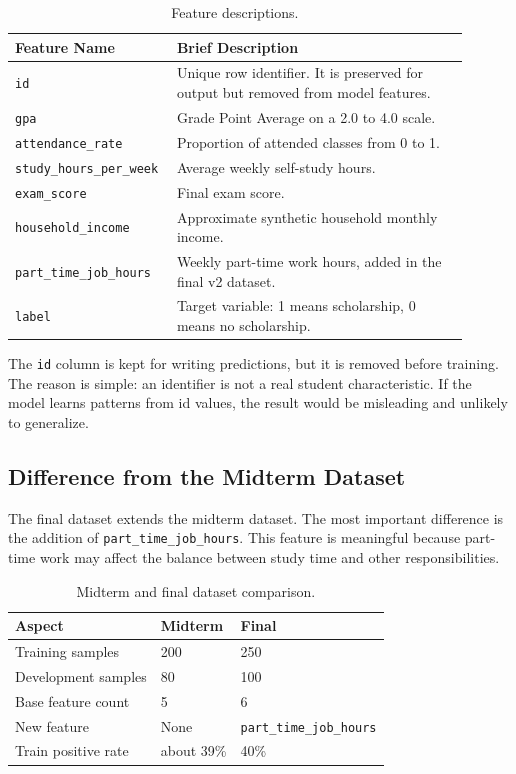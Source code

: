 ﻿\documentclass[12pt,a4paper]{article}
\begin{document}
\begin{table}[H]
\centering
\caption{Feature descriptions.}
\begin{tabular}{p{0.28\linewidth}p{0.62\linewidth}}
\toprule
\textbf{Feature Name} & \textbf{Brief Description} \\
\midrule
\texttt{id} & Unique row identifier. It is preserved for output but removed from model features. \\
\texttt{gpa} & Grade Point Average on a 2.0 to 4.0 scale. \\
\texttt{attendance\_rate} & Proportion of attended classes from 0 to 1. \\
\texttt{study\_hours\_per\_week} & Average weekly self-study hours. \\
\texttt{exam\_score} & Final exam score. \\
\texttt{household\_income} & Approximate synthetic household monthly income. \\
\texttt{part\_time\_job\_hours} & Weekly part-time work hours, added in the final v2 dataset. \\
\texttt{label} & Target variable: 1 means scholarship, 0 means no scholarship. \\
\bottomrule
\end{tabular}
\end{table}

The \texttt{id} column is kept for writing predictions, but it is removed before training. The reason is simple: an identifier is not a real student characteristic. If the model learns patterns from id values, the result would be misleading and unlikely to generalize.

\clearpage

\subsection{Difference from the Midterm Dataset}

The final dataset extends the midterm dataset. The most important difference is the addition of \texttt{part\_time\_job\_hours}. This feature is meaningful because part-time work may affect the balance between study time and other responsibilities.

\begin{table}[H]
\centering
\caption{Midterm and final dataset comparison.}
\begin{tabular}{lll}
\toprule
\textbf{Aspect} & \textbf{Midterm} & \textbf{Final} \\
\midrule
Training samples & 200 & 250 \\
Development samples & 80 & 100 \\
Base feature count & 5 & 6 \\
New feature & None & \texttt{part\_time\_job\_hours} \\
Train positive rate & about 39\% & 40\% \\
\bottomrule
\end{tabular}
\end{table}
\end{document}
